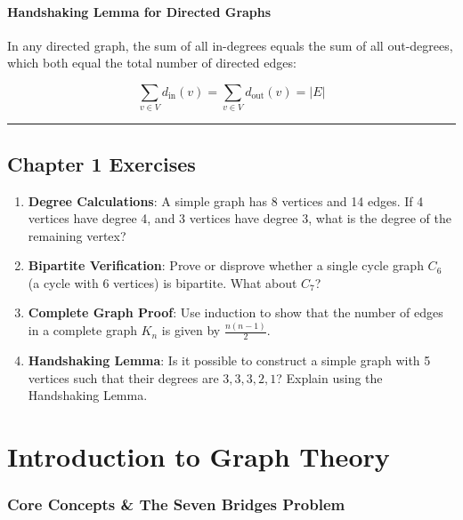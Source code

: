 \documentclass[
]{book}
\providecommand{\tightlist}{%
  \setlength{\itemsep}{0pt}\setlength{\parskip}{0pt}}
\theoremstyle{definition}
\theoremstyle{definition}
\theoremstyle{definition}
\theoremstyle{definition}
\theoremstyle{remark}
\begin{document}
\subsubsection{Handshaking Lemma for Directed Graphs}\label{handshaking-lemma-for-directed-graphs}

In any directed graph, the sum of all in-degrees equals the sum of all out-degrees, which both equal the total number of directed edges:

\[\sum_{v \in V} d_{\text{in}}(v) = \sum_{v \in V} d_{\text{out}}(v) = \vert{}E\vert{}\]

\begin{center}\rule{0.5\linewidth}{0.5pt}\end{center}

\section{Chapter 1 Exercises}\label{chapter-1-exercises}

\begin{enumerate}
\def\labelenumi{\arabic{enumi}.}
\tightlist
\item
  \textbf{Degree Calculations}: A simple graph has 8 vertices and 14 edges. If 4 vertices have degree 4, and 3 vertices have degree 3, what is the degree of the remaining vertex?
\item
  \textbf{Bipartite Verification}: Prove or disprove whether a single cycle graph \(C_6\) (a cycle with 6 vertices) is bipartite. What about \(C_7\)?
\item
  \textbf{Complete Graph Proof}: Use induction to show that the number of edges in a complete graph \(K_n\) is given by \(\frac{n(n-1)}{2}\).
\item
  \textbf{Handshaking Lemma}: Is it possible to construct a simple graph with 5 vertices such that their degrees are \(3, 3, 3, 2, 1\)? Explain using the Handshaking Lemma.
\end{enumerate}

\chapter{Introduction to Graph Theory}\label{introduction-to-graph-theory-1}

\subsection{Core Concepts \& The Seven Bridges Problem}\label{core-concepts-the-seven-bridges-problem}
\end{document}
